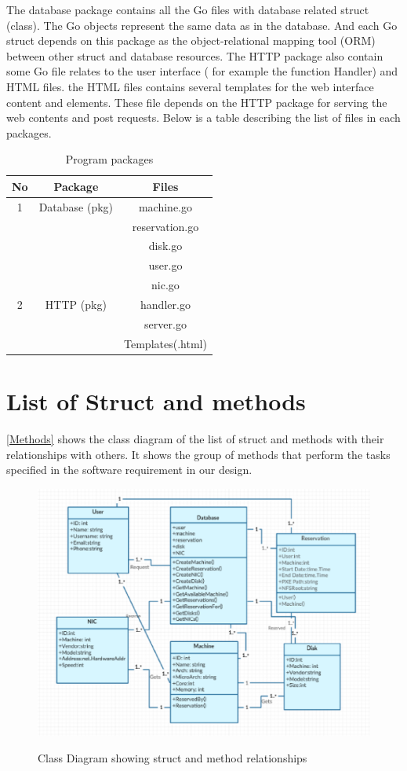 The database package contains all the Go files with database related struct (class). The Go objects represent the same data as in the database. And each Go struct depends on this package as the object-relational mapping tool (ORM) between other struct and database resources. The HTTP package also contain some Go file relates to the user interface ( for example the function Handler) and HTML files. the HTML files contains several templates for the web interface content and elements. These file depends on the HTTP package for serving the web contents and post requests. Below is a table describing the list of files in each packages.
\pagebreak
\begin{table}[h!]
  \centering
  \label{tab:table1}
  \begin{tabular}{ccc}
    \hline
    No & Package & Files\\
   \hline
    1 &Database (pkg)& machine.go\\
       &&reservation.go\\
      &&disk.go\\
      &&user.go\\
      &&nic.go\\
    \hline
    2 &HTTP (pkg)& handler.go\\
    &&server.go\\
    &&Templates(.html)\\
    \hline
  \end{tabular}
  \caption{Program packages}
\end{table}

\section{List of Struct and methods}
\autoref{Methods} shows the class diagram of the list of struct and methods with their relationships with others. It shows the group of methods that perform the tasks specified in the software requirement in our design.
\begin{figure}[h!]
\includegraphics[width = \linewidth]{methods.eps}
\label{Methods} 
\caption{Class Diagram showing struct and method relationships}
\end{figure}
\pagebreak
